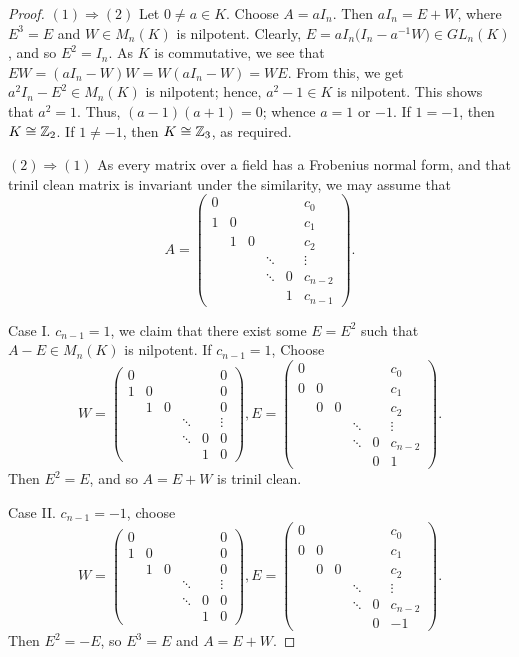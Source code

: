 \documentclass[12pt, reqno]{amsart}
\numberwithin{equation}{section}
\begin{document}
\begin{proof} $(1)\Rightarrow (2)$ Let $0\neq a\in K$. Choose $A=aI_n$. Then $aI_n=E+W$, where
$E^{3}=E$ and $W\in M_n(K)$ is nilpotent. Clearly,
$E=aI_n\big(I_n-a^{-1}W\big)\in GL_n(K)$, and so $E^2=I_n$. As $K$
is commutative, we see that $EW=(aI_n-W)W=W(aI_n-W)=WE$. From
this, we get $a^2I_n-E^2\in M_n(K)$ is nilpotent; hence, $a^2-1\in
K$ is nilpotent. This shows that $a^2=1$. Thus, $(a-1)(a+1)=0$; whence $a=1$ or $-1$. If $1=-1$,
then $K\cong {\Bbb Z}_2$. If $1\neq -1$, then $K\cong {\Bbb Z}_3$, as required.

$(2)\Rightarrow (1)$ As every
matrix over a field has a Frobenius normal form, and that trinil clean matrix is invariant under the similarity, we may assume
that $$A=\left(
\begin{array}{cccccc}
0&&&&&c_0\\
1&0&&&&c_1\\
&1&0&&&c_2\\
&&&\ddots&&\vdots\\
&&&\ddots&0&c_{n-2}\\
&&&&1&c_{n-1}
\end{array}
\right).$$

Case I. $c_{n-1} =1$, we claim that there exist some $E=E^2$  such that $A-E\in M_n(K)$ is nilpotent. If $c_{n-1}=1$, Choose $$W=\left(
\begin{array}{cccccc}
0&&&&&0\\
1&0&&&&0\\
&1&0&&&0\\
&&&\ddots&&\vdots\\
&&&\ddots&0&0\\
&&&&1&0
\end{array}
\right), E=\left(
\begin{array}{cccccc}
0&&&&&c_0\\
0&0&&&&c_1\\
&0&0&&&c_2\\
&&&\ddots&&\vdots\\
&&&\ddots&0&c_{n-2}\\
&&&&0&1
\end{array}
\right).$$ Then $E^2=E$, and so $A=E+W$ is trinil clean.

Case II. $c_{n-1}=-1$, choose $$W=\left(
\begin{array}{cccccc}
0&&&&&0\\
1&0&&&&0\\
&1&0&&&0\\
&&&\ddots&&\vdots\\
&&&\ddots&0&0\\
&&&&1&0
\end{array}
\right), E=\left(
\begin{array}{cccccc}
0&&&&&c_0\\
0&0&&&&c_1\\
&0&0&&&c_2\\
&&&\ddots&&\vdots\\
&&&\ddots&0&c_{n-2}\\
&&&&0&-1
\end{array}
\right).$$ Then $E^2=-E$, so $E^3=E$ and $A=E+W$.


\end{proof}
\end{document}

